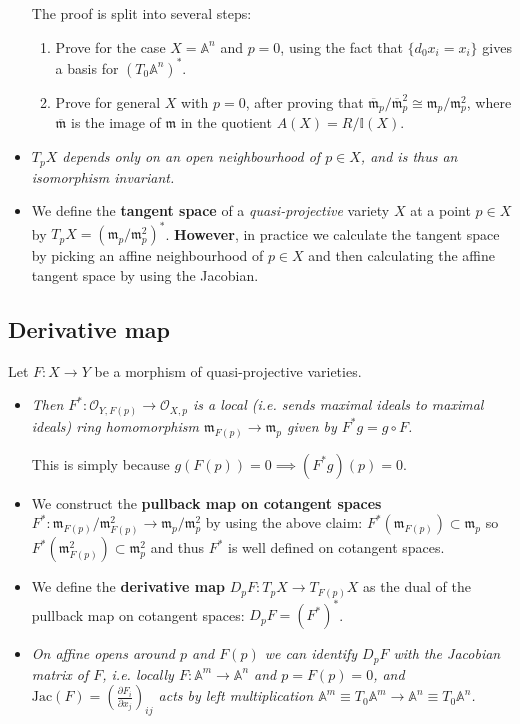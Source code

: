 \documentclass[10pt]{article}
\newcommand{\ide}{\mathbb{I}}
\newcommand{\aff}{\mathbb{A}}
\newcommand{\maid}{\mathfrak{m}}
\begin{document}
\begin{itemize}
                    The proof is split into several steps:
                    \begin{enumerate}
                        \item Prove for the case $X=\aff^n$ and $p=0$, using the fact that $\{d_0x_i=x_i\}$ gives a basis for $(T_0\aff^n)^*$.
                        \item Prove for general $X$ with $p=0$, after proving that $\overline{\maid}_p/\overline{\maid}_p^2\cong \maid_p/\maid_p^2$, where $\overline{\maid}$ is the image of $\maid$ in the quotient $A(X)=R/\ide(X)$.
                    \end{enumerate}

                \item \emph{$T_pX$ depends only on an open neighbourhood of $p\in X$, and is thus an isomorphism invariant.}
                \item We define the \textbf{tangent space} of a \emph{quasi-projective} variety $X$ at a point $p\in X$ by $T_pX=(\maid_p/\maid_p^2)^*$.
                    \textbf{However}, in practice we calculate the tangent space by picking an affine neighbourhood of $p\in X$ and then calculating the affine tangent space by using the Jacobian.
            \end{itemize}

        \subsection{Derivative map}

            Let $F\colon X\to Y$ be a morphism of quasi-projective varieties.

            \begin{itemize}
                \item \emph{Then $F^*\colon\mathcal{O}_{Y,F(p)}\to\mathcal{O}_{X,p}$ is a local (i.e. sends maximal ideals to maximal ideals) ring homomorphism $\maid_{F(p)}\to\maid_p$ given by $F^*g=g\circ F$.}

                    This is simply because $g(F(p))=0\implies (F^*g)(p)=0$.
                \item We construct the \textbf{pullback map on cotangent spaces} $F^*\colon\maid_{F(p)}/\maid_{F(p)}^2\to\maid_p/\maid_p^2$ by using the above claim: $F^*(\maid_{F(p)})\subset\maid_p$ so $F^*(\maid^2_{F(p)})\subset\maid_p^2$ and thus $F^*$ is well defined on cotangent spaces.
                \item We define the \textbf{derivative map} $D_pF\colon T_pX\to T_{F(p)}X$ as the dual of the pullback map on cotangent spaces: $D_pF=(F^*)^*$.
                \item \emph{On affine opens around $p$ and $F(p)$ we can identify $D_pF$ with the Jacobian matrix of $F$, i.e. locally $F\colon\aff^m\to\aff^n$ and $p=F(p)=0$, and $\mathrm{Jac}(F)=\left(\frac{\partial F_i}{\partial x_j}\right)_{ij}$ acts by left multiplication $\aff^m\equiv T_0\aff^m\to\aff^n\equiv T_0\aff^n$.}
            \end{itemize}
\end{document}
